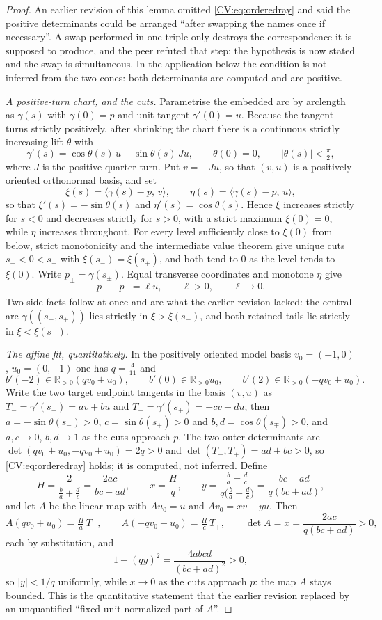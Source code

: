 \begin{proof}
An earlier revision of this lemma omitted \eqref{CV:eq:orderedray} and said the
positive determinants could be arranged ``after swapping the names once if
necessary''. A swap performed in one triple only destroys the correspondence it
is supposed to produce, and the peer refuted that step; the hypothesis is now
stated and the swap is simultaneous. In the application below the condition is
not inferred from the two cones: both determinants are computed and are
positive.

\emph{A positive-turn chart, and the cuts.} Parametrise the embedded arc by
arclength as $\gamma(s)$ with $\gamma(0)=p$ and unit tangent $\gamma'(0)=u$.
Because the tangent turns strictly positively, after shrinking the chart there
is a continuous strictly increasing lift $\theta$ with
\[
   \gamma'(s)=\cos\theta(s)\,u+\sin\theta(s)\,Ju,\qquad
   \theta(0)=0,\qquad |\theta(s)|<\tfrac\pi2,
\]
where $J$ is the positive quarter turn. Put $v=-Ju$, so that $(v,u)$ is a
positively oriented orthonormal basis, and set
\[
   \xi(s)=\langle\gamma(s)-p,\,v\rangle,\qquad
   \eta(s)=\langle\gamma(s)-p,\,u\rangle,
\]
so that $\xi'(s)=-\sin\theta(s)$ and $\eta'(s)=\cos\theta(s)$. Hence $\xi$
increases strictly for $s<0$ and decreases strictly for $s>0$, with a strict
maximum $\xi(0)=0$, while $\eta$ increases throughout. For every level
sufficiently close to $\xi(0)$ from below, strict monotonicity and the
intermediate value theorem give unique cuts $s_-<0<s_+$ with
$\xi(s_-)=\xi(s_+)$, and both tend to $0$ as the level tends to $\xi(0)$. Write
$p_\pm=\gamma(s_\pm)$. Equal transverse coordinates and monotone $\eta$ give
\[
   p_+-p_-=\ell u,\qquad \ell>0,\qquad \ell\to0 .
\]
Two side facts follow at once and are what the earlier revision lacked: the
central arc $\gamma((s_-,s_+))$ lies strictly in $\xi>\xi(s_-)$, and both
retained tails lie strictly in $\xi<\xi(s_-)$.

\emph{The affine fit, quantitatively.} In the positively oriented model basis
$v_0=(-1,0)$, $u_0=(0,-1)$ one has $q=\tfrac4{11}$ and
\[
   b'(-2)\in\mathbb R_{>0}(qv_0+u_0),\qquad
   b'(0)\in\mathbb R_{>0}u_0,\qquad
   b'(2)\in\mathbb R_{>0}(-qv_0+u_0).
\]
Write the two target endpoint tangents in the basis $(v,u)$ as
$T_-=\gamma'(s_-)=av+bu$ and $T_+=\gamma'(s_+)=-cv+du$; then
$a=-\sin\theta(s_-)>0$, $c=\sin\theta(s_+)>0$ and $b,d=\cos\theta(s_\mp)>0$,
and $a,c\to0$, $b,d\to1$ as the cuts approach $p$. The two outer determinants
are $\det(qv_0+u_0,-qv_0+u_0)=2q>0$ and $\det(T_-,T_+)=ad+bc>0$, so
\eqref{CV:eq:orderedray} holds; it is computed, not inferred. Define
\[
   H=\frac{2}{\tfrac ba+\tfrac dc}=\frac{2ac}{bc+ad},\qquad
   x=\frac Hq,\qquad
   y=\frac{\tfrac ba-\tfrac dc}{q\bigl(\tfrac ba+\tfrac dc\bigr)}
    =\frac{bc-ad}{q(bc+ad)},
\]
and let $A$ be the linear map with $A u_0=u$ and $Av_0=xv+yu$. Then
\[
   A(qv_0+u_0)=\tfrac Ha\,T_-,\qquad
   A(-qv_0+u_0)=\tfrac Hc\,T_+,\qquad
   \det A=x=\frac{2ac}{q(bc+ad)}>0,
\]
each by substitution, and
\[
   1-(qy)^2=\frac{4abcd}{(bc+ad)^2}>0,
\]
so $|y|<1/q$ uniformly, while $x\to0$ as the cuts approach $p$: the map $A$
stays bounded. This is the quantitative statement that the earlier revision
replaced by an unquantified ``fixed unit-normalized part of $A$''.


\end{proof}
